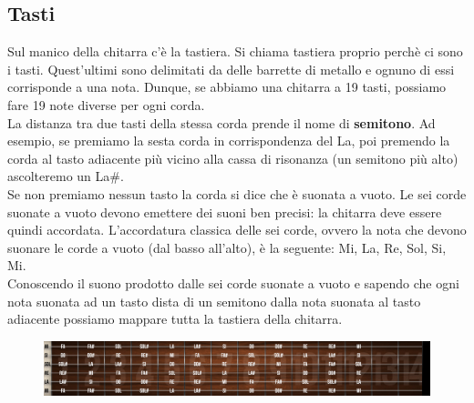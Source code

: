 \subsection{Tasti}
Sul manico della chitarra c’è la tastiera. Si chiama tastiera proprio perchè ci sono i tasti. Quest'ultimi sono delimitati da delle barrette di metallo e ognuno di essi corrisponde a una nota. Dunque, se abbiamo una chitarra a 19 tasti, possiamo fare 19 note diverse per ogni corda.\\
La distanza tra due tasti della stessa corda prende il nome di \textbf{semitono}. Ad esempio, se premiamo la sesta corda in corrispondenza del La, poi premendo la corda al tasto adiacente più vicino alla cassa di risonanza (un semitono più alto) ascolteremo un La\#.\\
Se non premiamo nessun tasto la corda si dice che è suonata a vuoto. Le sei corde suonate a vuoto devono emettere dei suoni ben precisi: la chitarra deve essere quindi accordata. L'accordatura classica delle sei corde, ovvero la nota che devono suonare le corde a vuoto (dal basso all'alto), è la seguente: Mi, La, Re, Sol, Si, Mi.\\
Conoscendo il suono prodotto dalle sei corde suonate a vuoto e sapendo che ogni nota suonata ad un tasto dista di un semitono dalla nota suonata al tasto adiacente possiamo mappare tutta la tastiera della chitarra.
\begin{figure}[H]
	\centering
	\includegraphics[scale=0.20]{./images/img13.jpg}
\end{figure}

